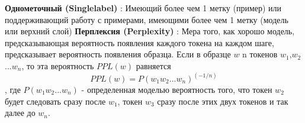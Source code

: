 \textbf{Однометочный (Singlelabel)} : Имеющий более чем 1 метку (пример) или поддерживающий работу с примерами, имеющими более чем 1 метку (модель или верхний слой)
\textbf{Перплексия (Perplexity)} : Мера того, как хорошо модель, предсказывающая вероятность появления каждого токена на каждом шаге, предсказывает вероятность появления образца. Если в образце $w$ n токенов $w_1$,$w_2$...$w_n$, то эта вероятность $PPL(w)$ равняется
\begin{equation} 
PPL(w) = P(w_1w_2... w_n)^(-1/n)
\end{equation},
где $P(w_1w_2... w_n)$ - определенная моделью вероятность того, что токен $w_2$ будет следовать сразу после $w_1$, токен $w_3$ сразу после этих двух токенов и так далее до $w_n$. 

